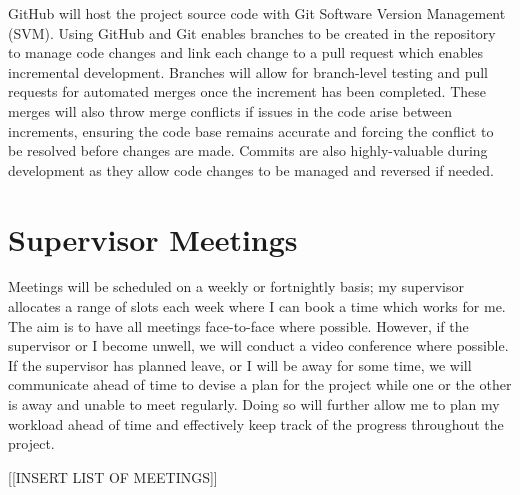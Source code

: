 GitHub will host the project source code with Git Software Version Management (SVM). Using GitHub and Git enables branches to be created in the repository to manage code changes and link each change to a pull request which enables incremental development. Branches will allow for branch-level testing and pull requests for automated merges once the increment has been completed. These merges will also throw merge conflicts if issues in the code arise between increments, ensuring the code base remains accurate and forcing the conflict to be resolved before changes are made. Commits are also highly-valuable during development as they allow code changes to be managed and reversed if needed. 

\section{Supervisor Meetings}
\label{pm:supervisor_meetings}

Meetings will be scheduled on a weekly or fortnightly basis; my supervisor allocates a range of slots each week where I can book a time which works for me. The aim is to have all meetings face-to-face where possible. However, if the supervisor or I become unwell, we will conduct a video conference where possible. If the supervisor has planned leave, or I will be away for some time, we will communicate ahead of time to devise a plan for the project while one or the other is away and unable to meet regularly. Doing so will further allow me to plan my workload ahead of time and effectively keep track of the progress throughout the project.

[[INSERT LIST OF MEETINGS]]